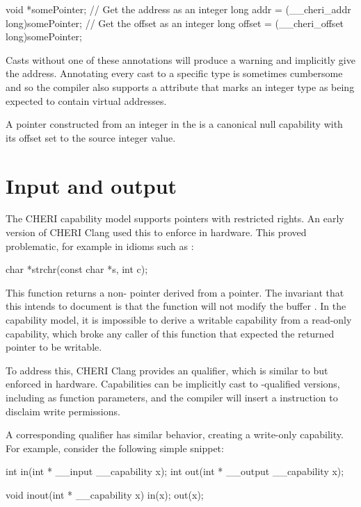 \begin{csnippet}
	void *somePointer;
	// Get the address as an integer
	long addr = (__cheri_addr long)somePointer;
	// Get the offset as an integer
	long offset = (__cheri_offset long)somePointer;
\end{csnippet}

Casts without one of these annotations will produce a warning and implicitly give the address.
Annotating every cast to a specific type is sometimes cumbersome and so the compiler also supports a  attribute that marks an integer type as being expected to contain virtual addresses.

A pointer constructed from an integer in the \sandboxABI{} is a canonical null capability with its offset set to the source integer value.

\section{Input and output}

The CHERI capability model supports pointers with restricted rights.
An early version of CHERI Clang used this to enforce  in hardware.
This proved problematic, for example in idioms such as :

\begin{csnippet}
char *strchr(const char *s, int c);
\end{csnippet}

This function returns a non- pointer derived from a  pointer.
The invariant that this intends to document is that the  function will not modify the buffer .
In the capability model, it is impossible to derive a writable capability from a read-only capability, which broke any caller of this function that expected the returned pointer to be writable.

To address this, CHERI Clang provides an  qualifier, which is similar to  but enforced in hardware.
Capabilities can be implicitly cast to -qualified versions, including as function parameters, and the compiler will insert a  instruction to disclaim write permissions.

A corresponding  qualifier has similar behavior, creating a write-only capability.
For example, consider the following simple snippet:

\begin{csnippet}
int in(int * __input __capability x);
int out(int * __output __capability x);

void inout(int * __capability x)
{
	in(x);
	out(x);
}
\end{csnippet}

